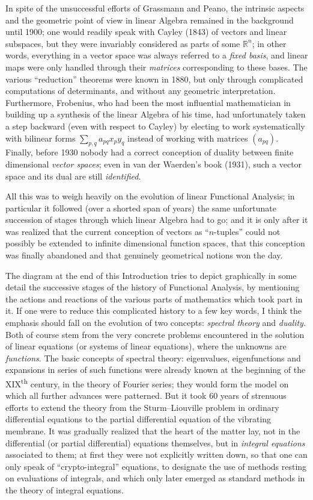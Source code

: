 \documentclass[12pt,a4paper,leqno,twoside]{extbook}
\newcommand{\supth}{\texorpdfstring{\textsuperscript{th}}{th}}
\newcommand{\R}{\mathbb{R}}
\begin{document}
In spite of the unsuccessful efforts of Grassmann and Peano, the intrinsic aspects and the geometric point of view in linear Algebra remained in the background until 1900; one would readily speak with Cayley (1843) of vectors and linear subspaces, but they were invariably considered as parts of some \(\R^n\); in other words, everything in a vector space was always referred to a \emph{fixed basis}, and linear maps were only handled through their \emph{matrices} corresponding to these bases. The various ``reduction'' theorems were known in 1880, but only through complicated computations of determinants, and without any geometric interpretation. Furthermore, Frobenius, who had been the most influential mathematician in building up a synthesis of the linear Algebra of his time, had unfortunately taken a step backward (even with respect to Cayley) by electing to work systematically with bilinear forms \(\sum_{p,q} a_{pq} x_p y_q\) instead of working with matrices \((a_{pq})\). Finally, before 1930 nobody had a correct conception of duality between finite dimensional \emph{vector spaces}; even in van der Waerden's book (1931), such a vector space and its dual are still \emph{identified}.

All this was to weigh heavily on the evolution of linear Functional Analysis; in particular it followed (over a shorted span of years) the same unfortunate succession of stages through which linear Algebra had to go; and it is only after it was realized that the current conception of vectors as ``\(n\)-tuples'' could not possibly be extended to infinite dimensional function spaces, that this conception was finally abandoned and that genuinely geometrical notions won the day.

The diagram at the end of this Introduction tries to depict graphically in some detail the successive stages of the history of Functional Analysis, by mentioning the actions and reactions of the various parts of mathematics which took part in it. If one were to reduce this complicated history to a few key words, I think the emphasis should fall on the evolution of two concepts: \emph{spectral theory} and \emph{duality}. Both of course stem from the very concrete problems encountered in the solution of linear equations (or systems of linear equations), where the unknowns are \emph{functions}. The basic concepts of spectral theory: eigenvalues, eigenfunctions and expansions in series of such functions were already known at the beginning of the XIX\supth{} century, in the theory of Fourier series; they would form the model on which all further advances were patterned. But it took 60 years of strenuous efforts to extend the theory from the Sturm--Liouville problem in ordinary differential equations to the partial differential equation of the vibrating membrane. It was gradually realized that the heart of the matter lay, not in the differential (or partial differential) equations themselves, but in \emph{integral equations} associated to them; at first they were not explicitly written down, so that one can only speak of ``crypto-integral'' equations, to designate the use of methods resting on evaluations of integrals, and which only later emerged as standard methods in the theory of integral equations.
\end{document}
